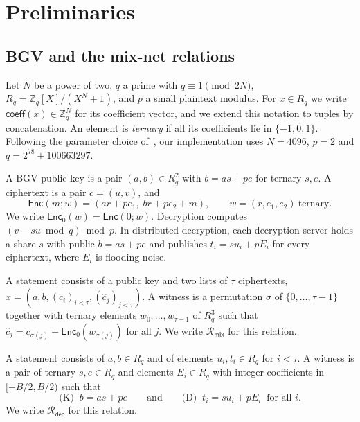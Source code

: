 \documentclass[sigconf,anonymous]{acmart}
\newcommand{\Zq}{\mathbb{Z}_q}
\newcommand{\Rq}{R_q}
\newcommand{\Enc}{\mathsf{Enc}}
\newcommand{\EncZ}{\mathsf{Enc}_0}
\newcommand{\coeff}{\mathsf{coeff}}
\newcommand{\Rmix}{\mathcal{R}_{\mathsf{mix}}}
\newcommand{\Rdec}{\mathcal{R}_{\mathsf{dec}}}
\newcommand{\ch}{\hat{c}}
\begin{document}
\section{Preliminaries}
\label{sec:prelim}

\subsection{BGV and the mix-net relations}

Let $N$ be a power of two, $q$ a prime with $q\equiv 1 \pmod{2N}$, $\Rq=\Zq[X]/(X^N+1)$, and $p$ a
small plaintext modulus. For $x\in\Rq$ we write $\coeff(x)\in\Zq^N$ for its coefficient vector,
and we extend this notation to tuples by concatenation. An element is \emph{ternary} if all its
coefficients lie in $\{-1,0,1\}$. Following the parameter choice of~\cite{ABGS23}, our
implementation uses $N=4096$, $p=2$ and $q=2^{78}+100663297$.

A BGV public key is a pair $(a,b)\in\Rq^2$ with $b=as+pe$ for ternary $s,e$. A ciphertext is a
pair $c=(u,v)$, and
\[
  \Enc(m;w)=(ar+pe_1,\; br+pe_2+m),\qquad w=(r,e_1,e_2)\ \text{ternary}.
\]
We write $\EncZ(w)=\Enc(0;w)$. Decryption computes $(v-su \bmod q)\bmod p$. In distributed
decryption, each decryption server holds a share $s$ with public $b=as+pe$ and publishes
$t_i=su_i+pE_i$ for every ciphertext, where $E_i$ is flooding noise.

\begin{definition}
A statement consists of a public key and two lists of $\tau$ ciphertexts,
$x=(a,b,(c_i)_{i<\tau},(\ch_j)_{j<\tau})$. A witness is a permutation $\sigma$ of
$\{0,\dots,\tau-1\}$ together with ternary elements $w_0,\dots,w_{\tau-1}$ of $\Rq^3$ such that
$\ch_j=c_{\sigma(j)}+\EncZ(w_{\sigma(j)})$ for all $j$. We write $\Rmix$ for this relation.
\end{definition}

\begin{definition}
A statement consists of $a,b\in\Rq$ and of elements $u_i,t_i\in\Rq$ for $i<\tau$. A witness is a
pair of ternary $s,e\in\Rq$ and elements $E_i\in\Rq$ with integer coefficients in $[-B/2,B/2)$
such that
\[
  \text{(K)}\;\; b=as+pe \qquad\text{and}\qquad \text{(D)}\;\; t_i=su_i+pE_i \;\;\text{for all } i .
\]
We write $\Rdec$ for this relation.
\end{definition}
\end{document}
